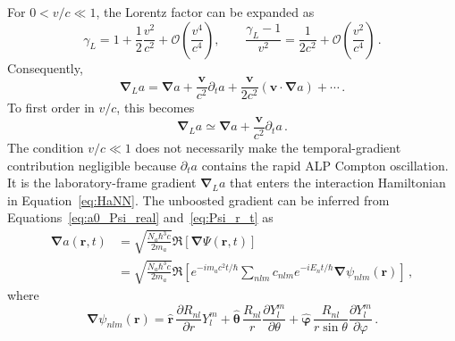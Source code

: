 For $0<v/c\ll1$, the Lorentz factor can be expanded as
\begin{equation}
    \gamma_L
    =1+\frac{1}{2}\frac{v^2}{c^2}
    +\mathcal{O}\left(\frac{v^4}{c^4}\right),
    \qquad
    \frac{\gamma_L-1}{v^2}
    =\frac{1}{2c^2}
    +\mathcal{O}\left(\frac{v^2}{c^4}\right)
    \,.
\end{equation}
Consequently,
\begin{equation}
    \boldsymbol{\nabla}_{L}a
    =
    \boldsymbol{\nabla}a
    +\frac{\mathbf{v}}{c^2}\partial_t a
    +\frac{\mathbf{v}}{2c^2}
    \left(\mathbf{v}\cdot\boldsymbol{\nabla}a\right)
    +\cdots
    \,.
\end{equation}
To first order in $v/c$, this becomes
\begin{equation}
    \boldsymbol{\nabla}_{L}a
    \simeq
    \boldsymbol{\nabla}a
    +\frac{\mathbf{v}}{c^2}\partial_t a
    \,.
\end{equation}
The condition $v/c\ll1$ does not necessarily make the temporal-gradient contribution negligible because $\partial_t a$ contains the rapid ALP Compton oscillation.
It is the laboratory-frame gradient $\boldsymbol{\nabla}_{L}a$ that enters the interaction Hamiltonian in Equation~\eqref{eq:HaNN}.
The unboosted gradient can be inferred from Equations~\eqref{eq:a0_Psi_real} and~\eqref{eq:Psi_r_t} as
\begin{align}
    \boldsymbol{\nabla}a(\mathbf{r}, t)
    &= \sqrt{\frac{N_a \hbar^3 c}{2 m_a}} \Re\left[ \boldsymbol{\nabla} \Psi(\mathbf{r}, t) \right] \\
    &= \sqrt{\frac{N_a \hbar^3 c}{2 m_a}} \Re\left[ e^{-i m_a c^2 t / \hbar}\sum_{nlm}^{} c_{nlm} e^{-i E_n t / \hbar} \boldsymbol{\nabla}\psi_{nlm}(\mathbf{r}) \right]
    \,,\label{eq:gradient_Psi_sum}
\end{align}
where
\begin{equation}
    \boldsymbol{\nabla}\psi_{nlm}(\mathbf{r})       
    = \hat{\mathbf{r}}\,\frac{\partial R_{nl}}{\partial r}Y_l^m + \hat{\boldsymbol{\theta}}\,\frac{R_{nl}}{r}\frac{\partial Y_l^m}{\partial \theta} + \hat{\boldsymbol{\varphi}}\,\frac{R_{nl}}{r\sin\theta}\frac{\partial Y_l^m}{\partial \varphi}
    \,.\label{eq:gradient_psi_nlm}
\end{equation}

